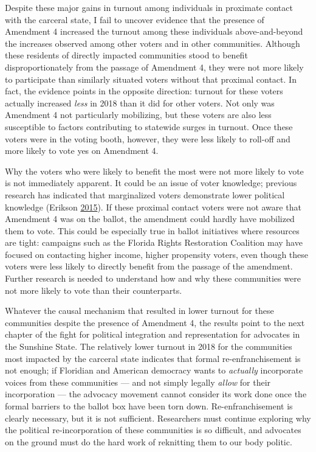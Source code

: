 \documentclass[
  12pt,
]{article}
\begin{document}
Despite these major gains in turnout among individuals in proximate contact with the carceral state, I fail to uncover evidence that the presence of Amendment 4 increased the turnout among these individuals above-and-beyond the increases observed among other voters and in other communities. Although these residents of directly impacted communities stood to benefit disproportionately from the passage of Amendment 4, they were not more likely to participate than similarly situated voters without that proximal contact. In fact, the evidence points in the opposite direction: turnout for these voters actually increased \emph{less} in 2018 than it did for other voters. Not only was Amendment 4 not particularly mobilizing, but these voters are also less susceptible to factors contributing to statewide surges in turnout. Once these voters were in the voting booth, however, they were less likely to roll-off and more likely to vote yes on Amendment 4.

Why the voters who were likely to benefit the most were not more likely to vote is not immediately apparent. It could be an issue of voter knowledge; previous research has indicated that marginalized voters demonstrate lower political knowledge (Erikson \protect\hyperlink{ref-Erikson2015}{2015}). If these proximal contact voters were not aware that Amendment 4 was on the ballot, the amendment could hardly have mobilized them to vote. This could be especially true in ballot initiatives where resources are tight: campaigns such as the Florida Rights Restoration Coalition may have focused on contacting higher income, higher propensity voters, even though these voters were less likely to directly benefit from the passage of the amendment. Further research is needed to understand how and why these communities were not more likely to vote than their counterparts.

Whatever the causal mechanism that resulted in lower turnout for these communities despite the presence of Amendment 4, the results point to the next chapter of the fight for political integration and representation for advocates in the Sunshine State. The relatively lower turnout in 2018 for the communities most impacted by the carceral state indicates that formal re-enfranchisement is not enough; if Floridian and American democracy wants to \emph{actually} incorporate voices from these communities --- and not simply legally \emph{allow} for their incorporation --- the advocacy movement cannot consider its work done once the formal barriers to the ballot box have been torn down. Re-enfranchisement is clearly necessary, but it is not sufficient. Researchers must continue exploring why the political re-incorporation of these communities is so difficult, and advocates on the ground must do the hard work of reknitting them to our body politic.
\end{document}
